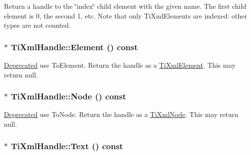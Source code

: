 \label{class_ti_xml_handle_a979a3f850984a176ee884e394c7eed2d}
Return a handle to the \char`\"{}index\char`\"{} child element with the given name. The first child element is 0, the second 1, etc. Note that only TiXmlElements are indexed: other types are not counted. \hypertarget{class_ti_xml_handle_acb5fe8388a526289ea65e817a51e05e7}{
\subsubsection[{Element}]{$\ast$ TiXmlHandle::Element () const}}
\label{class_ti_xml_handle_acb5fe8388a526289ea65e817a51e05e7}
\begin{Desc}
\item[\hyperlink{deprecated__deprecated000002}{Deprecated}]use ToElement. Return the handle as a \hyperlink{class_ti_xml_element}{TiXmlElement}. This may return null. \end{Desc}
\hypertarget{class_ti_xml_handle_ab44b723a8dc9af72838a303c079d0376}{
\subsubsection[{Node}]{$\ast$ TiXmlHandle::Node () const}}
\label{class_ti_xml_handle_ab44b723a8dc9af72838a303c079d0376}
\begin{Desc}
\item[\hyperlink{deprecated__deprecated000001}{Deprecated}]use ToNode. Return the handle as a \hyperlink{class_ti_xml_node}{TiXmlNode}. This may return null. \end{Desc}
\hypertarget{class_ti_xml_handle_a9fc739c8a18d160006f82572fc143d13}{
\subsubsection[{Text}]{$\ast$ TiXmlHandle::Text () const}}
\label{class_ti_xml_handle_a9fc739c8a18d160006f82572fc143d13}
